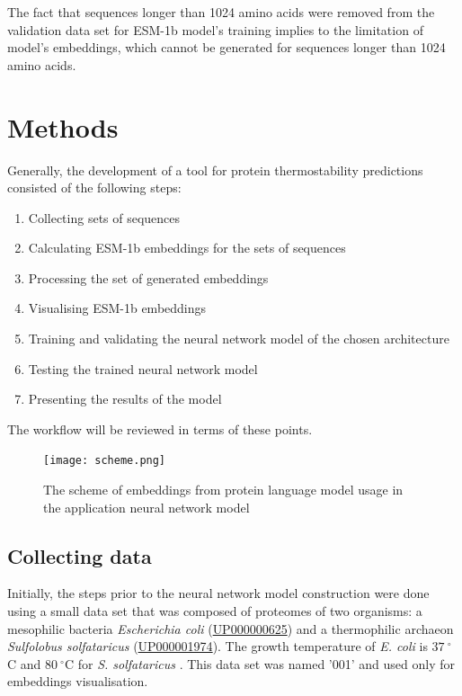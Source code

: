 \documentclass[12pt]{article}
\begin{document}
	The fact that sequences longer than 1024 amino acids were removed from the 
	validation data set for ESM-1b model's training implies to the limitation of 
	model's embeddings, which cannot be generated for sequences longer than 
	1024 amino acids.

	\newpage

	\section{Methods}

	Generally, the development of a tool for protein thermostability predictions
	consisted of the following steps:

	\begin{enumerate}
		\item Collecting sets of sequences
		\item Calculating ESM-1b embeddings for the sets of sequences
		\item Processing the set of generated embeddings
		\item Visualising ESM-1b embeddings
		\item Training and validating the neural network model of the chosen architecture 
		\item Testing the trained neural network model
		\item Presenting the results of the model
	\end{enumerate}

	The workflow will be reviewed in terms of these points.

	\begin{figure}[h!]
		\centering
		\texttt{[image: scheme.png]}

		\caption{The scheme of embeddings from protein language model usage in the 
		application neural network model}
		\label{figure:EmbeddingsUsageScheme}
	\end{figure}

	\subsection{Collecting data}

	Initially, the steps prior to the neural network model construction 
	were done using a small data set that was composed of proteomes of two 
	organisms: a mesophilic bacteria \textit{Escherichia coli} 
	(\href{https://www.uniprot.org/proteomes/UP000000625}{UP000000625}) and a 
	thermophilic archaeon \textit{Sulfolobus solfataricus} 
	(\href{https://www.uniprot.org/proteomes/UP000001974}{UP000001974}). The 
	growth temperature of \textit{E. coli} is $37\ ^\circ$C \cite{jang2017environmental}
	and $80\ ^\circ$C for \textit{S. solfataricus} \cite{zaparty2010hot}. This 
	data set was named '001' and used only for embeddings visualisation.
\end{document}
